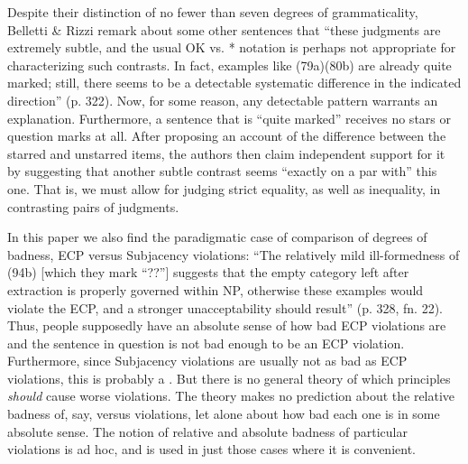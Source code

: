 Despite their distinction of no fewer than seven degrees of grammaticality, Belletti \& Rizzi remark about some other sentences that ``these judgments are extremely subtle, and the usual OK vs. * notation is perhaps not appropriate for characterizing such contrasts. In fact, examples like (79a)\textendash{}(80b) are already quite
marked; still, there seems to be a detectable systematic difference in the indicated direction'' (p. 322). Now, for some reason, any detectable pattern warrants an explanation. Furthermore, a sentence that is ``quite marked'' receives no stars or question marks at all. After proposing an account of the difference between the starred and unstarred items, the authors then claim independent support for it by suggesting that another subtle contrast seems ``exactly on a par with'' this one. That is, we must allow for judging strict equality, as well as inequality, in contrasting pairs of judgments.

In this paper we also find the paradigmatic case of comparison of degrees of badness, ECP versus Subjacency violations: ``The relatively mild ill-formedness of (94b) [which they mark ``??''] suggests that the empty category left after extraction is properly governed within NP, otherwise these examples would violate the ECP, and a stronger unacceptability should result'' (p. 328, fn. 22). Thus, people supposedly have an absolute sense of how bad ECP violations are and the sentence in question is not bad enough to be an ECP violation. Furthermore, since Subjacency violations are usually not as bad as ECP violations, this is probably a . But there is no general theory of which principles \textit{should} cause worse violations. The theory makes no prediction about the relative badness of, say,  versus  violations, let alone about how bad each one is in some absolute sense. The notion of relative and absolute badness of particular violations is ad hoc, and is used in just those cases where it is convenient.

